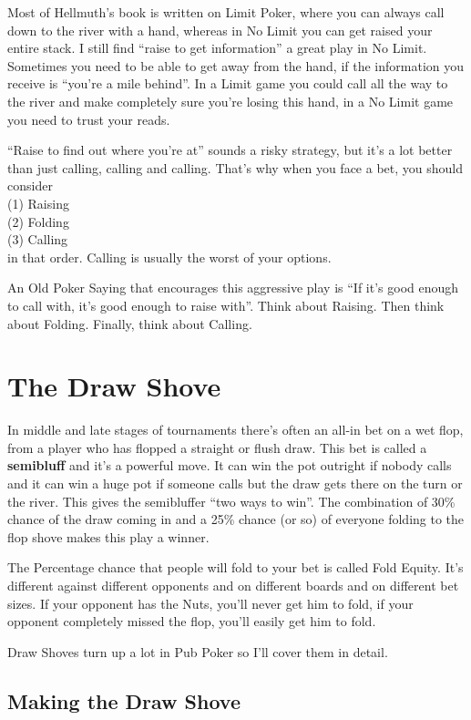 Most of Hellmuth's book is written on Limit Poker, where you can always
call down to the river with a hand, whereas in No Limit you can get
raised your entire stack. I still find ``raise to get
information'' a great play in No Limit. Sometimes you need to
be able to get away from the hand, if the information you receive
is ``you're a mile behind''. In a Limit game you could call all the
way to the river and make completely sure you're losing this hand, in
a No Limit game you need to trust your reads.

``Raise to find out where you're at'' sounds a risky strategy,
but it's a lot better than just calling, calling and calling.
That's why when you face a bet, you should consider \\
(1) Raising \\
(2) Folding \\
(3) Calling \\
in that order. Calling is usually the worst of your options.

An Old Poker Saying that encourages this aggressive play is
``If it's good enough to call with, it's good enough to raise with''.
Think about Raising. Then think about Folding. Finally, think
about Calling.

\section{The Draw Shove}

In middle and late stages of tournaments there's often an all-in bet
on a wet flop, from a player who has flopped a straight or flush draw.
This bet is called a \textbf{semibluff} and it's a powerful move.
It can win the pot outright if nobody calls and it can win a huge pot
if someone calls but the draw gets there on the turn or the river.
This gives the semibluffer ``two ways to win''. The combination
of 30\% chance of the draw coming in and a 25\% chance (or so) of
everyone folding to the flop shove makes this play a winner.

The Percentage chance that people will fold to your bet is
called Fold Equity. It's different against different opponents
and on different boards and on different bet sizes. If your opponent has
the Nuts, you'll never get him to fold, if your opponent completely
missed the flop, you'll easily get him to fold.

Draw Shoves turn up a lot in Pub Poker so I'll cover them in detail.

\subsection{Making the Draw Shove}

